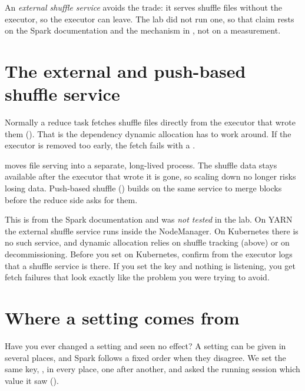 An \emph{external shuffle service} avoids the trade: it serves shuffle files
without the executor, so the executor can leave. The lab did not run one, so that
claim rests on the Spark documentation and the mechanism in
, not on a measurement.

\section{The external and push-based shuffle service}
\label{sec:shuffle-external}

Normally a reduce task fetches shuffle files directly from the executor that wrote
them (). That is the dependency dynamic allocation has to
work around. If the executor is removed too early, the fetch fails with a
.

 moves file serving into a separate, long-lived
process. The shuffle data stays available after the executor that wrote it is gone,
so scaling down no longer risks losing data. Push-based shuffle
() builds on the same service to merge blocks before the
reduce side asks for them.

\begin{warning}
This is from the Spark documentation and was \emph{not tested} in the lab. On YARN
the external shuffle service runs inside the NodeManager. On Kubernetes there is no
such service, and dynamic allocation relies on shuffle tracking (above) or on
decommissioning. Before you set  on Kubernetes,
confirm from the executor logs that a shuffle service is there. If you set
the key and nothing is listening, you get fetch failures that look exactly like the
problem you were trying to avoid.
\end{warning}

\section{Where a setting comes from}
\label{sec:tuning-precedence}

Have you ever changed a setting and seen no effect? A setting can be given in
several places, and Spark follows a fixed order when they disagree. We set the same
key, , in every place, one after another, and
asked the running session which value it saw ().

